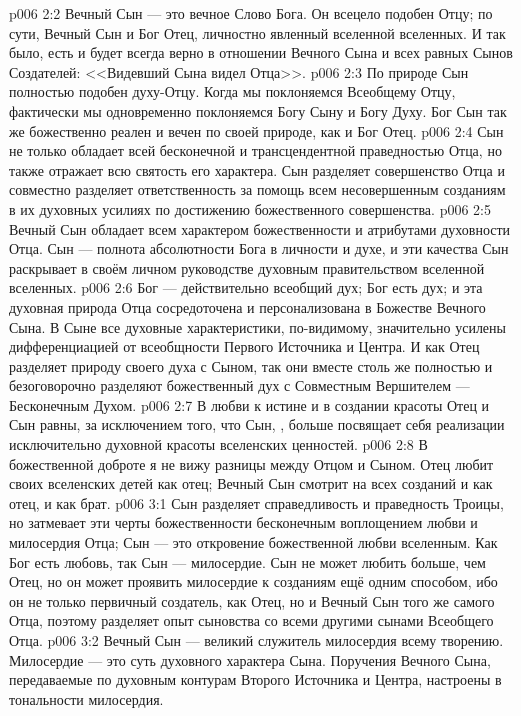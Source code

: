 \vs p006 2:2 Вечный Сын --- это вечное Слово Бога. Он всецело подобен Отцу; по сути, Вечный Сын и  Бог Отец, личностно явленный вселенной вселенных. И так было, есть и будет всегда верно в отношении Вечного Сына и всех равных Сынов Создателей: <<Видевший Сына видел Отца>>.
\vs p006 2:3 По природе Сын полностью подобен духу\hyp{}Отцу. Когда мы поклоняемся Всеобщему Отцу, фактически мы одновременно поклоняемся Богу Сыну и Богу Духу. Бог Сын так же божественно реален и вечен по своей природе, как и Бог Отец.
\vs p006 2:4 Сын не только обладает всей бесконечной и трансцендентной праведностью Отца, но также отражает всю святость его характера. Сын разделяет совершенство Отца и совместно разделяет ответственность за помощь всем несовершенным созданиям в их духовных усилиях по достижению божественного совершенства.
\vs p006 2:5 Вечный Сын обладает всем характером божественности и атрибутами духовности Отца. Сын ---  полнота абсолютности Бога в личности и духе, и эти качества Сын раскрывает в своём личном руководстве духовным правительством вселенной вселенных.
\vs p006 2:6 Бог --- действительно всеобщий дух; Бог есть дух; и эта духовная природа Отца сосредоточена и персонализована в Божестве Вечного Сына. В Сыне все духовные характеристики, по\hyp{}видимому, значительно усилены дифференциацией от всеобщности Первого Источника и Центра. И как Отец разделяет природу своего духа с Сыном, так они вместе столь же полностью и безоговорочно разделяют божественный дух с Совместным Вершителем --- Бесконечным Духом.
\vs p006 2:7 В любви к истине и в создании красоты Отец и Сын равны, за исключением того, что Сын, , больше посвящает себя реализации исключительно духовной красоты вселенских ценностей.
\vs p006 2:8 В божественной доброте я не вижу разницы между Отцом и Сыном. Отец любит своих вселенских детей как отец; Вечный Сын смотрит на всех созданий и как отец, и как брат.
\vs p006 3:1 Сын разделяет справедливость и праведность Троицы, но затмевает эти черты божественности бесконечным воплощением любви и милосердия Отца; Сын --- это откровение божественной любви вселенным. Как Бог есть любовь, так Сын --- милосердие. Сын не может любить больше, чем Отец, но он может проявить милосердие к созданиям ещё одним способом, ибо он не только первичный создатель, как Отец, но и Вечный Сын того же самого Отца, поэтому разделяет опыт сыновства со всеми другими сынами Всеобщего Отца.
\vs p006 3:2 Вечный Сын --- великий служитель милосердия всему творению. Милосердие --- это суть духовного характера Сына. Поручения Вечного Сына, передаваемые по духовным контурам Второго Источника и Центра, настроены в тональности милосердия.
